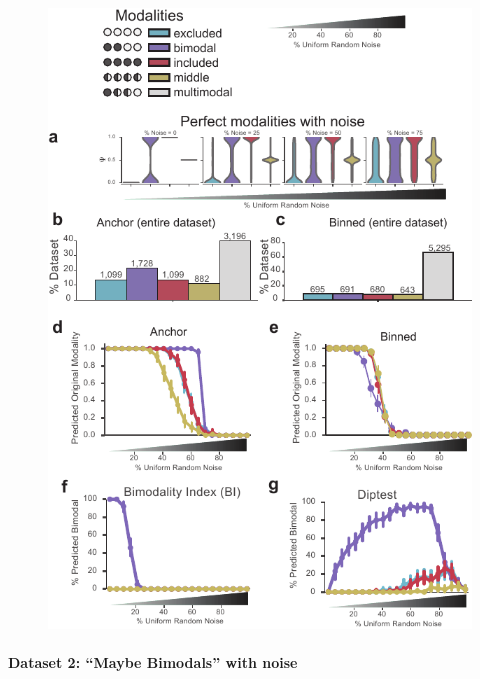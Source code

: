 \begin{figure}[h]
\ContinuedFloat
\captionsetup{labelformat=empty}
\centering
\includegraphics[width=5.8in]{figures/anchor_simulations_perfect_modalities.pdf}
\end{figure}
\addtocounter{figure}{1}
\clearpage


\paragraph{Dataset 2: ``Maybe Bimodals'' with noise}
\label{sec:anchor_maybe_bimodals}

